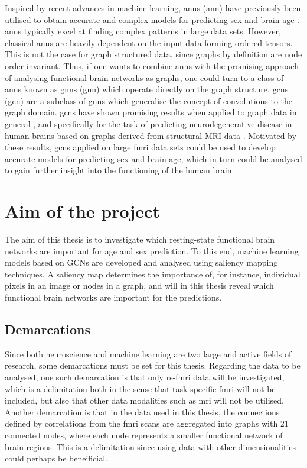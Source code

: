 Inspired by recent advances in machine learning, \acrlong{ann}s (\acrshort{ann}) have previously been utilised to obtain accurate and complex models for predicting sex and brain age \cite{amoroso_multiplex_age, stankeviciute, arslan}. \acrshort{ann}s typically excel at finding complex patterns in large data sets. However, classical \acrshort{ann}s are heavily dependent on the input data forming ordered tensors. This is not the case for graph structured data, since graphs by definition are node order invariant. Thus, if one wants to combine \acrshort{ann}s with the promising approach of analysing functional brain networks as graphs, one could turn to a class of \acrshort{ann}s known as \acrlong{gnn}s (\acrshort{gnn}) which operate directly on the graph structure. \acrlong{gcn}s (\acrshort{gcn}) are a subclass of \acrshort{gnn}s which generalise the concept of convolutions to the graph domain. \acrshort{gcn}s have shown promising results when applied to graph data in general \cite{kipf_semi_supervised, kipf_vae, wu_review}, and specifically for the task of predicting neurodegenerative disease in human brains based on graphs derived from structural-MRI data \cite{jansson_sandstrom}. Motivated by these results, \acrshort{gcn}s applied on large \acrshort{fmri} data sets could be used to develop accurate models for predicting sex and brain age, which in turn could be analysed to gain further insight into the functioning of the human brain.


\section{Aim of the project}
The aim of this thesis is to investigate which resting-state functional brain networks are important for age and sex prediction. To this end, machine learning models based on GCNs are developed and analysed using saliency mapping techniques. A saliency map determines the importance of, for instance, individual pixels in an image or nodes in a graph, and will in this thesis reveal which functional brain networks are important for the predictions. 

\subsection{Demarcations}
Since both neuroscience and machine learning are two large and active fields of research, some demarcations must be set for this thesis. Regarding the data to be analysed, one such demarcation is that only \acrshort{rs-fmri} data will be investigated, which is a delimitation both in the sense that task-specific \acrshort{fmri} will not be included, but also that other data modalities such as \acrshort{mri} will not be utilised. Another demarcation is that in the data used in this thesis, the connections defined by correlations from the \acrshort{fmri} scans are aggregated into graphs with 21 connected nodes, where each node represents a smaller functional network of brain regions. This is a delimitation since using data with other dimensionalities could perhaps be beneificial.

